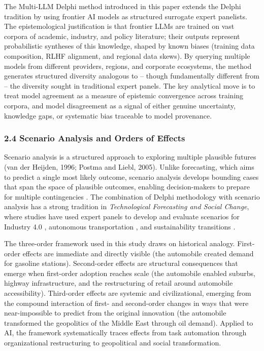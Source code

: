 \documentclass{article}
\begin{document}
The Multi-LLM Delphi method introduced in this paper extends the Delphi tradition by using frontier AI models as structured surrogate expert panelists. The epistemological justification is that frontier LLMs are trained on vast corpora of academic, industry, and policy literature; their outputs represent probabilistic syntheses of this knowledge, shaped by known biases (training data composition, RLHF alignment, and regional data skews). By querying multiple models from different providers, regions, and corporate ecosystems, the method generates structured diversity analogous to -- though fundamentally different from -- the diversity sought in traditional expert panels. The key analytical move is to treat model agreement as a measure of epistemic convergence across training corpora, and model disagreement as a signal of either genuine uncertainty, knowledge gaps, or systematic bias traceable to model provenance.


\subsubsection{2.4 Scenario Analysis and Orders of Effects}
\label{sec:2_4_scenario_analysis_and_orders_of_effects}

Scenario analysis is a structured approach to exploring multiple plausible futures (van der Heijden, 1996; Postma and Liebl, 2005). Unlike forecasting, which aims to predict a single most likely outcome, scenario analysis develops bounding cases that span the space of plausible outcomes, enabling decision-makers to prepare for multiple contingencies \citep{banuls2011scenario}. The combination of Delphi methodology with scenario analysis has a strong tradition in \textit{Technological Forecasting and Social Change}, where studies have used expert panels to develop and evaluate scenarios for Industry 4.0 \citep{culot2020manufacturing}, autonomous transportation \citep{fritschy2019autonomous}, and sustainability transitions \citep{geels2020b}.

The three-order framework used in this study draws on historical analogy. First-order effects are immediate and directly visible (the automobile created demand for gasoline stations). Second-order effects are structural consequences that emerge when first-order adoption reaches scale (the automobile enabled suburbs, highway infrastructure, and the restructuring of retail around automobile accessibility). Third-order effects are systemic and civilizational, emerging from the compound interaction of first- and second-order changes in ways that were near-impossible to predict from the original innovation (the automobile transformed the geopolitics of the Middle East through oil demand). Applied to AI, the framework systematically traces effects from task automation through organizational restructuring to geopolitical and social transformation.
\end{document}
